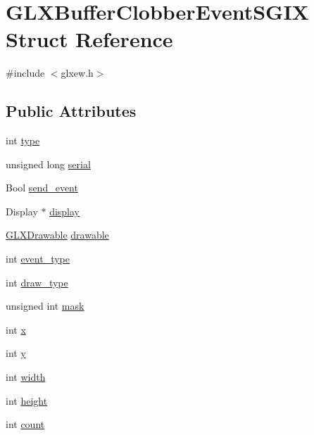 \hypertarget{struct_g_l_x_buffer_clobber_event_s_g_i_x}{}\section{G\+L\+X\+Buffer\+Clobber\+Event\+S\+G\+IX Struct Reference}
\label{struct_g_l_x_buffer_clobber_event_s_g_i_x}


{\ttfamily \#include $<$glxew.\+h$>$}

\subsection*{Public Attributes}
\begin{DoxyCompactItemize}
\item 
int \hyperlink{struct_g_l_x_buffer_clobber_event_s_g_i_x_a36e3e8a5feea664623ea43d0f273b63a}{type}
\item 
unsigned long \hyperlink{struct_g_l_x_buffer_clobber_event_s_g_i_x_ac295e3276a7986eeae4d6a2a28c7e0b7}{serial}
\item 
Bool \hyperlink{struct_g_l_x_buffer_clobber_event_s_g_i_x_af43bf0edbe40a74ef58dfb546a75118b}{send\+\_\+event}
\item 
Display $\ast$ \hyperlink{struct_g_l_x_buffer_clobber_event_s_g_i_x_afef060d81026da75c846727f4a3de9d4}{display}
\item 
\hyperlink{glxew_8h_a826f51745d9d6c81bdbac47ae2b80cf7}{G\+L\+X\+Drawable} \hyperlink{struct_g_l_x_buffer_clobber_event_s_g_i_x_a9c45674193ed80a79261c3b7518ee04f}{drawable}
\item 
int \hyperlink{struct_g_l_x_buffer_clobber_event_s_g_i_x_a0b405123f1d6528f1f4dfa7ff92bde9b}{event\+\_\+type}
\item 
int \hyperlink{struct_g_l_x_buffer_clobber_event_s_g_i_x_a25c31e8cbec0919f74a1e93ae74175b1}{draw\+\_\+type}
\item 
unsigned int \hyperlink{struct_g_l_x_buffer_clobber_event_s_g_i_x_a74b4ad1ad3cac011001151411f621da1}{mask}
\item 
int \hyperlink{struct_g_l_x_buffer_clobber_event_s_g_i_x_a5118d48c3c8d5253d39922b5014b52ff}{x}
\item 
int \hyperlink{struct_g_l_x_buffer_clobber_event_s_g_i_x_aef21efa11558a5b67861f96471c56003}{y}
\item 
int \hyperlink{struct_g_l_x_buffer_clobber_event_s_g_i_x_adad23535733161528427584a42bfc6eb}{width}
\item 
int \hyperlink{struct_g_l_x_buffer_clobber_event_s_g_i_x_a7838dbabb76c22aa8241310a3f2363ea}{height}
\item 
int \hyperlink{struct_g_l_x_buffer_clobber_event_s_g_i_x_ad8f4f0aae058e0a1ff542679823e37a9}{count}
\end{DoxyCompactItemize}


